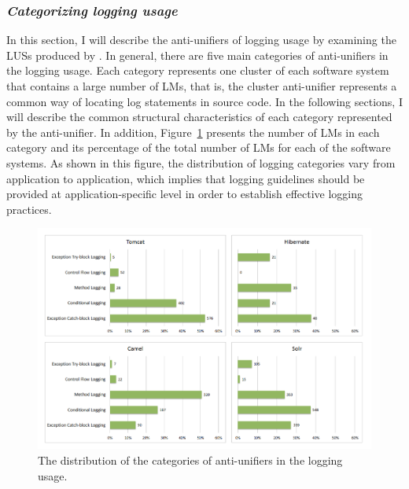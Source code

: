 \subsubsection{\emph{Categorizing logging usage}} \label{categories}
In this section, I will describe the anti-unifiers of logging usage by examining the LUSs produced by . In general, there are five main categories of anti-unifiers in the logging usage. Each category represents one cluster of each software system that contains a large number of LMs, that is, the cluster anti-unifier represents a common way of locating log statements in source code. In the following sections, I will describe the common structural characteristics of each category represented by the anti-unifier. In addition, Figure~\ref{fig:categories} presents the number of LMs in each category and its percentage of the total number of LMs for each of the software systems. As shown in this figure, the distribution of logging categories vary from application to application, which implies that logging guidelines should be provided at application-specific level in order to establish effective logging practices.
\begin{figure} [p]
   \centering\includegraphics [width = 1\textwidth, height = 0.7\textheight]{Charts/Categories.png}
  \caption{The distribution of the categories of anti-unifiers in the logging usage.}
  \label{fig:categories}
\end{figure}



